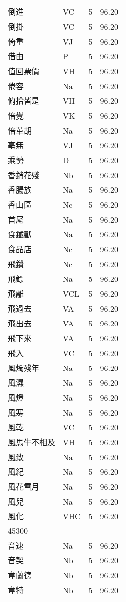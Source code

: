 \documentclass[twocolumn]{book}
\begin{document}
\begin{supertabular}{llrr}
倒進 & VC & 5 &  96.20\\
倒掛 & VC & 5 &  96.20\\
倚重 & VJ & 5 &  96.20\\
借由 & P & 5 &  96.20\\
值回票價 & VH & 5 &  96.20\\
倦容 & Na & 5 &  96.20\\
俯拾皆是 & VH & 5 &  96.20\\
倍覺 & VK & 5 &  96.20\\
倍革胡 & Na & 5 &  96.20\\
亳無 & VJ & 5 &  96.20\\
乘勢 & D & 5 &  96.20\\
香銷花殘 & Nb & 5 &  96.20\\
香腸族 & Na & 5 &  96.20\\
香山區 & Nc & 5 &  96.20\\
首尾 & Na & 5 &  96.20\\
食鐵獸 & Na & 5 &  96.20\\
食品店 & Nc & 5 &  96.20\\
飛鑽 & Nc & 5 &  96.20\\
飛鏢 & Na & 5 &  96.20\\
飛離 & VCL & 5 &  96.20\\
飛過去 & VA & 5 &  96.20\\
飛出去 & VA & 5 &  96.20\\
飛下來 & VA & 5 &  96.20\\
飛入 & VC & 5 &  96.20\\
風燭殘年 & Na & 5 &  96.20\\
風濕 & Na & 5 &  96.20\\
風燈 & Na & 5 &  96.20\\
風寒 & Na & 5 &  96.20\\
風乾 & VC & 5 &  96.20\\
風馬牛不相及 & VH & 5 &  96.20\\
風致 & Na & 5 &  96.20\\
風紀 & Na & 5 &  96.20\\
風花雪月 & Na & 5 &  96.20\\
風兒 & Na & 5 &  96.20\\
風化 & VHC & 5 &  96.20\\
45300\\
音速 & Na & 5 &  96.20\\
音契 & Nb & 5 &  96.20\\
韋蘭德 & Nb & 5 &  96.20\\
韋特 & Nb & 5 &  96.20\\

\end{supertabular}
\end{document}
